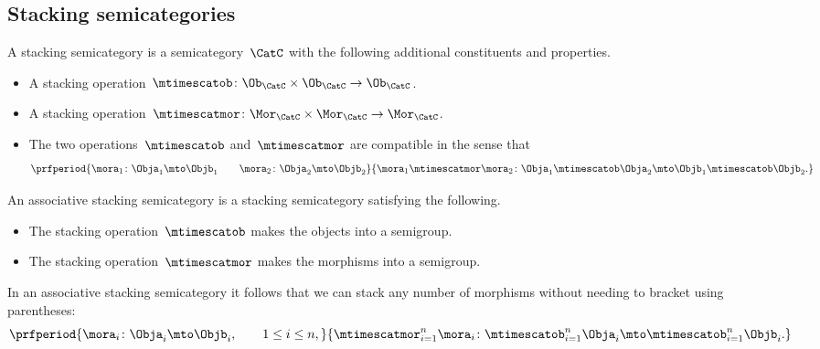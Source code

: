 \subsection{Stacking semicategories}

\begin{ctdefinition}
    \label{def:simple-stacking-semi-cat}
    A stacking semicategory is a semicategory~$\CatC$ with the following additional constituents and properties.

    \constit
    \begin{itemize}
        \item A stacking operation~$\mtimescatob \colon \Ob_\CatC \times \Ob_\CatC \to \Ob_\CatC$.
        \item A stacking operation~$\mtimescatmor \colon \Mor_\CatC \times \Mor_\CatC \to \Mor_\CatC$.
    \end{itemize}

    \condit
    \begin{itemize}
        \item The two operations~$\mtimescatob$ and~$\mtimescatmor$ are compatible in the sense that
              \begin{equation}
                  \prfperiod{
                      \mora_1 \colon \Obja_1 \mto \Objb_1
                      \qquad
                      \mora_2 \colon \Obja_2 \mto \Objb_2
                  }{
                      \mora_1 \mtimescatmor \mora_2 \colon  \Obja_1 \mtimescatob  \Obja_2 \mto \Objb_1 \mtimescatob \Objb_2.
                  }
              \end{equation}
    \end{itemize}
\end{ctdefinition}

\begin{ctdefinition}
    \label{def:stacking-semi-cat}
    An associative stacking semicategory is a stacking semicategory satisfying the following.

    \condit
    \begin{itemize}
        \item The stacking operation~$\mtimescatob$ makes the objects into a semigroup.
        \item The stacking operation~$\mtimescatmor$ makes the morphisms into a semigroup.
    \end{itemize}
\end{ctdefinition}

\begin{remark}
    In an associative stacking semicategory it follows that we can stack any number of morphisms without needing to bracket using parentheses:
    \begin{equation}
        \prfperiod{
            \mora_i \colon \Obja_i \mto \Objb_i, \qquad 1 \leq i \leq n,
        }{
            \mtimescatmor_{i=1}^n \mora_i \colon  \mtimescatob_{i=1}^n \Obja_i \mto \mtimescatob_{i=1}^n \Objb_i.
        }
    \end{equation}
\end{remark}



